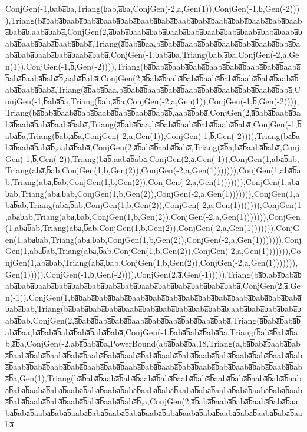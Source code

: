 ConjGen(-1,b̅aba̅b̅a,Triang(b̅ab,a̅b̅a,ConjGen(-2,a,Gen(1)),ConjGen(-1,b̅,Gen(-2)))),Triang(ba̅b̅aba̅b̅aaba̅b̅aba̅b̅aaba̅b̅aba̅b̅aaba̅b̅aba̅b̅aaba̅b̅aba̅b̅aaba̅b̅aba̅b̅aaba̅b̅aba̅b̅aaba̅b̅aba̅b̅,aaba̅b̅aba̅,ConjGen(2,a̅b̅aba̅b̅aaba̅b̅aba̅b̅aaba̅b̅aba̅b̅aaba̅b̅aba̅b̅aaba̅b̅aba̅b̅aaba̅b̅aba̅b̅aaba̅b̅aba̅b̅aaba̅b̅aba̅,Triang(a̅b̅aba̅b̅aa,ba̅b̅aba̅b̅aaba̅b̅aba̅b̅aaba̅b̅aba̅b̅aaba̅b̅aba̅b̅aaba̅b̅aba̅b̅aaba̅b̅aba̅b̅aaba̅b̅aba̅,ConjGen(-1,b̅aba̅b̅a,Triang(b̅ab,a̅b̅a,ConjGen(-2,a,Gen(1)),ConjGen(-1,b̅,Gen(-2)))),Triang(ba̅b̅aba̅b̅aaba̅b̅aba̅b̅aaba̅b̅aba̅b̅aaba̅b̅aba̅b̅aaba̅b̅aba̅b̅aaba̅b̅aba̅b̅,aaba̅b̅aba̅,ConjGen(2,a̅b̅aba̅b̅aaba̅b̅aba̅b̅aaba̅b̅aba̅b̅aaba̅b̅aba̅b̅aaba̅b̅aba̅b̅aaba̅b̅aba̅,Triang(a̅b̅aba̅b̅aa,ba̅b̅aba̅b̅aaba̅b̅aba̅b̅aaba̅b̅aba̅b̅aaba̅b̅aba̅b̅aaba̅b̅aba̅,ConjGen(-1,b̅aba̅b̅a,Triang(b̅ab,a̅b̅a,ConjGen(-2,a,Gen(1)),ConjGen(-1,b̅,Gen(-2)))),Triang(ba̅b̅aba̅b̅aaba̅b̅aba̅b̅aaba̅b̅aba̅b̅aaba̅b̅aba̅b̅,aaba̅b̅aba̅,ConjGen(2,a̅b̅aba̅b̅aaba̅b̅aba̅b̅aaba̅b̅aba̅b̅aaba̅b̅aba̅,Triang(a̅b̅aba̅b̅aa,ba̅b̅aba̅b̅aaba̅b̅aba̅b̅aaba̅b̅aba̅,ConjGen(-1,b̅aba̅b̅a,Triang(b̅ab,a̅b̅a,ConjGen(-2,a,Gen(1)),ConjGen(-1,b̅,Gen(-2)))),Triang(ba̅b̅aba̅b̅aaba̅b̅aba̅b̅,aaba̅b̅aba̅,ConjGen(2,a̅b̅aba̅b̅aaba̅b̅aba̅,Triang(a̅b̅a,ba̅b̅aaba̅b̅aba̅,ConjGen(-1,b̅,Gen(-2)),Triang(ba̅b̅,aaba̅b̅aba̅,ConjGen(2,a̅,Gen(-1)),ConjGen(1,aba̅b̅ab,Triang(aba̅,b̅ab,ConjGen(1,b,Gen(2)),ConjGen(-2,a,Gen(1))))))),ConjGen(1,aba̅b̅ab,Triang(aba̅,b̅ab,ConjGen(1,b,Gen(2)),ConjGen(-2,a,Gen(1))))))),ConjGen(1,aba̅b̅ab,Triang(aba̅,b̅ab,ConjGen(1,b,Gen(2)),ConjGen(-2,a,Gen(1))))))),ConjGen(1,aba̅b̅ab,Triang(aba̅,b̅ab,ConjGen(1,b,Gen(2)),ConjGen(-2,a,Gen(1))))))),ConjGen(1,aba̅b̅ab,Triang(aba̅,b̅ab,ConjGen(1,b,Gen(2)),ConjGen(-2,a,Gen(1))))))),ConjGen(1,aba̅b̅ab,Triang(aba̅,b̅ab,ConjGen(1,b,Gen(2)),ConjGen(-2,a,Gen(1))))))),ConjGen(1,aba̅b̅ab,Triang(aba̅,b̅ab,ConjGen(1,b,Gen(2)),ConjGen(-2,a,Gen(1))))))),ConjGen(1,aba̅b̅ab,Triang(aba̅,b̅ab,ConjGen(1,b,Gen(2)),ConjGen(-2,a,Gen(1))))))),ConjGen(1,aba̅b̅ab,Triang(aba̅,b̅ab,ConjGen(1,b,Gen(2)),ConjGen(-2,a,Gen(1))))))),Gen(1))))),ConjGen(-1,b̅,Gen(-2)))),ConjGen(2,a̅,Gen(-1))))),Triang(ba̅b̅,aba̅b̅aba̅b̅aba̅b̅aba̅b̅aaba̅b̅aba̅b̅aba̅b̅aba̅b̅aba̅b̅aba̅b̅aaba̅b̅aba̅b̅aba̅b̅aba̅b̅aba̅b̅aba̅,ConjGen(2,a̅,Gen(-1)),ConjGen(1,ba̅b̅aba̅b̅aba̅b̅aba̅b̅aaba̅b̅aba̅b̅aba̅b̅aba̅b̅aba̅b̅aba̅b̅aaba̅b̅aba̅b̅aba̅b̅aba̅b̅aba̅b̅ab,Triang(ba̅b̅aba̅b̅aba̅b̅aba̅b̅aaba̅b̅aba̅b̅aba̅b̅aba̅b̅aba̅b̅aba̅b̅,aaba̅b̅aba̅b̅aba̅b̅aba̅b̅aba̅b̅ab,ConjGen(2,a̅b̅aba̅b̅aba̅b̅aba̅b̅aaba̅b̅aba̅b̅aba̅b̅aba̅b̅aba̅b̅aba̅,Triang(a̅b̅aba̅b̅aba̅b̅aba̅b̅aa,ba̅b̅aba̅b̅aba̅b̅aba̅b̅aba̅b̅aba̅,ConjGen(-1,b̅aba̅b̅aba̅b̅aba̅b̅a,Triang(b̅aba̅b̅aba̅b̅ab,a̅b̅a,ConjGen(-2,aba̅b̅aba̅b̅a,PowerBound(aba̅b̅aba̅b̅a,18,Triang(a,ba̅b̅aba̅b̅aaba̅b̅aba̅b̅aaba̅b̅aba̅b̅aaba̅b̅aba̅b̅aaba̅b̅aba̅b̅aaba̅b̅aba̅b̅aaba̅b̅aba̅b̅aaba̅b̅aba̅b̅aaba̅b̅aba̅b̅aaba̅b̅aba̅b̅aaba̅b̅aba̅b̅aaba̅b̅aba̅b̅aaba̅b̅aba̅b̅aaba̅b̅aba̅b̅aaba̅b̅aba̅b̅aaba̅b̅aba̅b̅aaba̅b̅aba̅b̅aaba̅b̅aba̅b̅a,Gen(1),Triang(ba̅b̅aba̅b̅aaba̅b̅aba̅b̅aaba̅b̅aba̅b̅aaba̅b̅aba̅b̅aaba̅b̅aba̅b̅aaba̅b̅aba̅b̅aaba̅b̅aba̅b̅aaba̅b̅aba̅b̅aaba̅b̅aba̅b̅aaba̅b̅aba̅b̅aaba̅b̅aba̅b̅aaba̅b̅aba̅b̅aaba̅b̅aba̅b̅aaba̅b̅aba̅b̅aaba̅b̅aba̅b̅aaba̅b̅aba̅b̅aaba̅b̅aba̅b̅aaba̅b̅aba̅b̅,a,ConjGen(2,a̅b̅aba̅b̅aaba̅b̅aba̅b̅aaba̅b̅aba̅b̅aaba̅b̅aba̅b̅aaba̅b̅aba̅b̅aaba̅b̅aba̅b̅aaba̅b̅aba̅b̅aaba̅b̅aba̅b̅aaba̅b̅aba̅b̅aaba̅b̅aba̅b̅aaba̅b̅aba̅b̅aaba̅